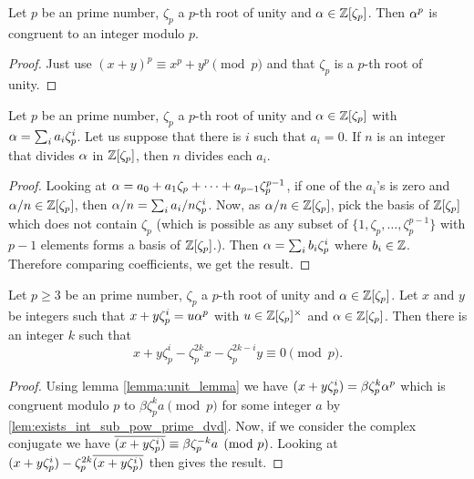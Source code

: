 \begin{lemma}\label{lem:exists_int_sub_pow_prime_dvd}
	\leanok
	Let $p$ be an prime number, $\zeta_p$ a $p$-th root of unity and $\alpha \in \mathbb{Z}[\zeta_p]$. Then $\alpha^p$ is congruent to an integer modulo $p$.
\end{lemma}
\begin{proof}
	\leanok
	Just use $(x+y)^p \equiv x^p + y^p \pmod p$ and that $\zeta_p$ is a $p$-th root of unity.
\end{proof}

\begin{lemma}\label{lem:dvd_coeff_cycl_integer}
	\leanok
	Let $p$ be an prime number, $\zeta_p$ a $p$-th root of unity and $ \alpha \in \mathbb{Z}[\zeta_p]$ with $\alpha=\sum_i a_i \zeta_p^i$. Let us suppose that there is $i$ such that $a_i = 0$. If $n$ is an integer that divides $\alpha$ in $\mathbb{Z}[\zeta_p]$, then $n$ divides each $a_i$.
\end{lemma}
\begin{proof}
	\leanok
	Looking at $\alpha=a_0+a_1\zeta_p+\cdots+a_{p-1}\zeta_p^{p-1}$, if one of the $a_i$'s is zero and $\alpha/n \in \mathbb{Z}[\zeta_p]$, then $\alpha/n=\sum_i a_i/n \zeta_p^i$. Now, as $\alpha/n \in \mathbb{Z}[\zeta_p]$, pick the basis of $\mathbb{Z}[\zeta_p]$ which does not contain $\zeta_p$ (which is possible as any subset of $\{1,\zeta_p,\dots,\zeta_p^{p-1}\}$ with $p-1$ elements forms a basis of $\mathbb{Z}[\zeta_p]$.). Then $\alpha=\sum_i b_i \zeta_p^i$ where $b_i \in \mathbb{Z}$. Therefore comparing coefficients, we get the result.
\end{proof}

\begin{lemma}\label{lem:exists_int_sum_eq_zero}
	\leanok
	Let $p \geq 3$ be an prime number, $\zeta_p$ a $p$-th root of unity and $ \alpha \in \mathbb{Z}[\zeta_p]$. Let $x$ and $y$ be integers such that $x+y\zeta_p^i=u \alpha^p$ with $u \in \mathbb{Z}[\zeta_p]^\times$ and $\alpha \in \mathbb{Z}[\zeta_p]$. Then there is an integer $k$ such that \[x+y\zeta_p^i-\zeta_p^{2k}x-\zeta_p^{2k-i}y \equiv 0 \pmod p.\]
\end{lemma}
\begin{proof}
	\leanok
	Using lemma \ref{lemma:unit_lemma} we have $(x+y\zeta_p^i) =\beta \zeta_p^k \alpha^p$ which is congruent modulo $p$ to $\beta \zeta_p^k a \pmod p$ for some integer $a$ by \ref{lem:exists_int_sub_pow_prime_dvd}. Now, if we consider the complex conjugate we have $\overline{(x+y\zeta_p^i)  }\equiv \beta \zeta_p^{-k}a \pmod p$. Looking at $(x+y\zeta_p^i)-\zeta_p^{2k}\overline{(x+y\zeta_p^i)  }$ then gives the result.
\end{proof}

